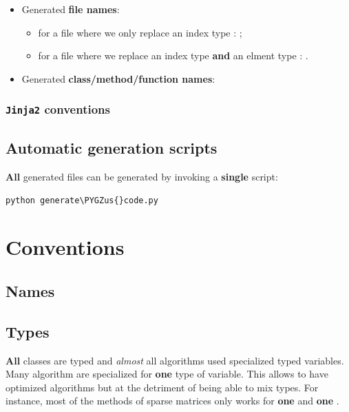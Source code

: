 \documentclass[letterpaper,10pt,english]{sphinxmanual}
\def\PYGZus{\char`\_}
\begin{document}
\begin{itemize}
\item {} 
Generated \textbf{file names}:
\begin{itemize}
\item {} 
for a file  where we only replace an index type : ;

\item {} 
for a file  where we replace an index type  \textbf{and} an elment type : .

\end{itemize}

\item {} 
Generated \textbf{class/method/function names}:

\end{itemize}


\subsubsection{\textbf{\texttt{Jinja2}} conventions}
\label{cysparse_lib_mainteners:jinja2-conventions}

\subsection{Automatic generation scripts}
\label{cysparse_lib_mainteners:automatic-generation-scripts}
\textbf{All} generated files can be generated by invoking a \textbf{single} script:

\begin{Verbatim}[commandchars=\\\{\}]
python generate\PYGZus{}code.py
\end{Verbatim}


\section{Conventions}
\label{cysparse_lib_mainteners:id5}

\subsection{Names}
\label{cysparse_lib_mainteners:names}

\subsection{Types}
\label{cysparse_lib_mainteners:id6}
\textbf{All} classes are typed and \emph{almost} all algorithms used specialized typed variables. Many algorithm are specialized for \textbf{one} type of variable. This allows to have optimized algorithms but at the detriment of being able to mix types. For instance, most of the methods of sparse matrices only works for \textbf{one}  and \textbf{one} .
\end{document}
